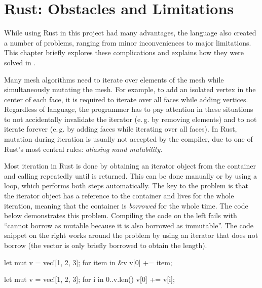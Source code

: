 \chapter{Rust: Obstacles and Limitations}

While using Rust in this project had many advantages, the language also created a number of problems, ranging from minor inconveniences to major limitations.
This chapter briefly explores these complications and explains how they were solved in .

\vspace{1cm}

Many mesh algorithms need to iterate over elements of the mesh while simultaneously mutating the mesh.
For example, to add an isolated vertex in the center of each face, it is required to iterate over all faces while adding vertices.
Regardless of language, the programmer has to pay attention in these situations to not accidentally invalidate the iterator (e.\,g. by removing elements) and to not iterate forever (e.\,g. by adding faces while iterating over all faces).
In Rust, mutation during iteration is usually not accepted by the compiler, due to one of Rust's most central rules: \emph{aliasing nand mutability}.

Most iteration in Rust is done by obtaining an iterator object from the container and calling  repeatedly until  is returned.
This can be done manually or by using a  loop, which performs both steps automatically.
The key to the problem is that the iterator object has a reference to the container and lives for the whole iteration, meaning that the container is \emph{borrowed} for the whole time.
The code below demonstrates this problem.
Compiling the code on the left fails with \enquote{cannot borrow  as mutable because it is also borrowed as immutable}.
The code snippet on the right works around the problem by using an iterator that does not borrow  (the vector is only briefly borrowed to obtain the length).

\vspace{5mm}
\begin{minipage}{0.49\textwidth}
  \begin{rustcode}
    let mut v = vec![1, 2, 3];
    for item in &v {
        v[0] += item;
    }
  \end{rustcode}
\end{minipage}
\begin{minipage}{0.49\textwidth}
  \begin{rustcode}
    let mut v = vec![1, 2, 3];
    for i in 0..v.len() {
        v[0] += v[i];
    }
  \end{rustcode}
\end{minipage}
\vspace{5mm}

